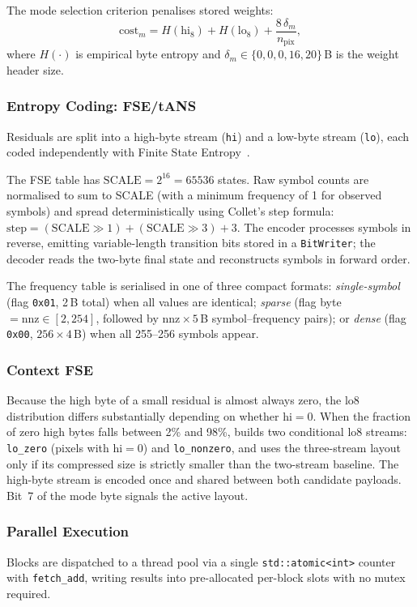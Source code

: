 The mode selection criterion penalises stored weights:
\[
  \text{cost}_m = H(\mathrm{hi}_8) + H(\mathrm{lo}_8)
                + \frac{8\,\delta_m}{n_{\text{pix}}},
\]
where $H(\cdot)$ is empirical byte entropy and
$\delta_m \in \{0,0,0,16,20\}$\,B is the weight header size.

\subsubsection*{Entropy Coding: FSE/tANS}
Residuals are split into a high-byte stream (\texttt{hi}) and a low-byte
stream (\texttt{lo}), each coded independently with Finite State
Entropy~\cite{collet2013fse}.

The FSE table has $\text{SCALE}=2^{16}=65536$ states. Raw symbol counts
are normalised to sum to SCALE (with a minimum frequency of 1 for observed
symbols) and spread deterministically using Collet's step formula:
$\text{step} = (\text{SCALE}\gg1) + (\text{SCALE}\gg3) + 3$.
The encoder processes symbols in reverse, emitting variable-length
transition bits stored in a \texttt{BitWriter}; the decoder reads the
two-byte final state and reconstructs symbols in forward order.

The frequency table is serialised in one of three compact formats:
\emph{single-symbol} (flag \texttt{0x01}, 2\,B total) when all values are
identical; \emph{sparse} (flag byte $= \text{nnz} \in [2,254]$, followed by
$\text{nnz}\times5$\,B symbol--frequency pairs); or \emph{dense}
(flag \texttt{0x00}, $256\times4$\,B) when all 255--256 symbols appear.

\subsubsection*{Context FSE}
Because the high byte of a small residual is almost always zero, the lo8
distribution differs substantially depending on whether $\mathrm{hi}=0$.
When the fraction of zero high bytes falls between 2\% and 98\%, \allrounder{}
builds two conditional lo8 streams: \texttt{lo\_zero}
(pixels with $\mathrm{hi}=0$) and \texttt{lo\_nonzero}, and uses the
three-stream layout only if its compressed size is strictly smaller than the
two-stream baseline. The high-byte stream is encoded once and shared between
both candidate payloads. Bit~7 of the mode byte signals the active layout.

\subsubsection*{Parallel Execution}
Blocks are dispatched to a thread pool via a single
\texttt{std::atomic<int>} counter with \texttt{fetch\_add}, writing results
into pre-allocated per-block slots with no mutex required.

